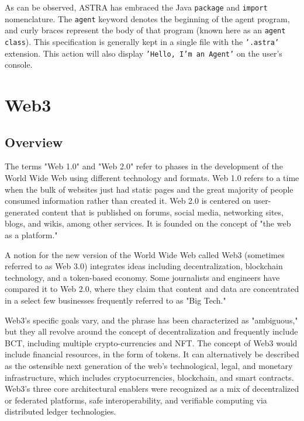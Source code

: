 \vspace{.5cm}

As can be observed, ASTRA has embraced the Java \texttt{package} and \texttt{import} nomenclature. The \texttt{agent} keyword denotes the beginning of the agent program, and curly braces represent the body of that program (known here as an \texttt{agent class}). This specification is generally kept in a single file with the \texttt{'.astra'} extension. This action will also display \texttt{'Hello, I'm an Agent'} on the user's console.

\section{Web3}

\subsection{Overview}
The terms "Web 1.0" and "Web 2.0" refer to phases in the development of the World Wide Web using different technology and formats. Web 1.0 refers to a time when the bulk of websites just had static pages and the great majority of people consumed information rather than created it. Web 2.0 is centered on user-generated content that is published on forums, social media, networking sites, blogs, and wikis, among other services. It is founded on the concept of "the web as a platform."

\vspace{.5cm}

A notion for the new version of the World Wide Web called Web3 (sometimes referred to as Web 3.0) integrates ideas including decentralization, blockchain technology, and a token-based economy. Some journalists and engineers have compared it to Web 2.0, where they claim that content and data are concentrated in a select few businesses frequently referred to as "Big Tech."

\vspace{.5cm}

Web3's specific goals vary, and the phrase has been characterized as "ambiguous," but they all revolve around the concept of decentralization and frequently include \ac{BCT}, including multiple crypto-currencies and \ac{NFT}. The concept of Web3 would include financial resources, in the form of tokens. It can alternatively be described as the ostensible next generation of the web's technological, legal, and monetary infrastructure, which includes cryptocurrencies, blockchain, and smart contracts. Web3's three core architectural enablers were recognized as a mix of decentralized or federated platforms, safe interoperability, and verifiable computing via distributed ledger technologies.

